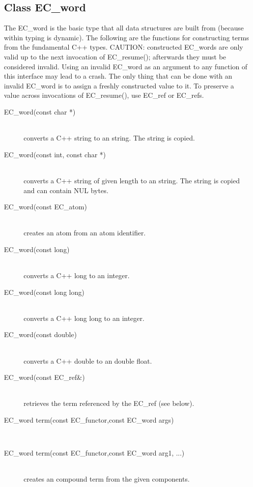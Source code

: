 \subsection{Class EC_word}
The EC_word is the basic type that all {\eclipse} data structures are
built from (because within {\eclipse} typing is dynamic).
The following are the functions for constructing {\eclipse} terms from
the fundamental C++ types.
CAUTION: constructed EC_words are only valid up to the next invocation
of EC_resume(); afterwards they must be considered invalid.  Using an invalid
EC_word as an argument to any function of this interface may lead to a crash.
The only thing that can be done with an invalid EC_word is to assign a
freshly constructed value to it.  To preserve a value across invocations of
EC_resume(), use EC_ref or EC_refs.
\begin{description}
\item[EC_word(const char *)]\ \\
	converts a C++ string to an {\eclipse} string. The string is copied.

\item[EC_word(const int, const char *)]\ \\
	converts a C++ string of given length to an {\eclipse} string.
	The string is copied and can contain NUL bytes.

\item[EC_word(const EC_atom)]\ \\
	creates an {\eclipse} atom from an atom identifier.

\item[EC_word(const long)]\ \\
	converts a C++ long to an {\eclipse} integer.

\item[EC_word(const long long)]\ \\
	converts a C++ long long to an {\eclipse} integer.

\item[EC_word(const double)]\ \\
	converts a C++ double to an {\eclipse} double float.

\item[EC_word(const EC_ref\&)]\ \\
	retrieves the {\eclipse} term referenced by the EC_ref (see below).

\item[EC_word term(const EC_functor,const EC_word args\nil)]\ \\
\item[EC_word term(const EC_functor,const EC_word arg1, ...)]\ \\
	creates an {\eclipse} compound term from the given components.


\end{description}
